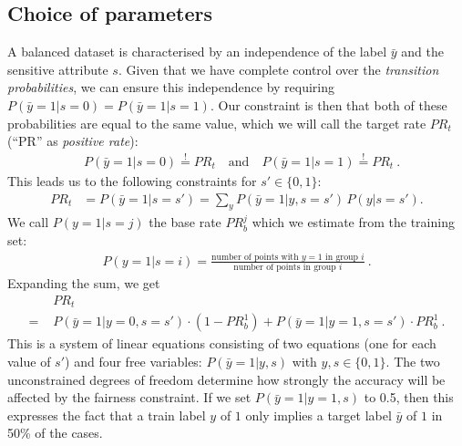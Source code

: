 \subsection{Choice of parameters}\label{sec:dp}
A balanced dataset is characterised by an independence of the label $\bar{y}$ and the sensitive attribute $s$.
Given that we have complete control over the \emph{transition probabilities},
we can ensure this independence by requiring $P(\bar{y}=1|s=0)=P(\bar{y}=1|s=1)$.
Our constraint is then that both of these probabilities are equal to the same value,
which we will call the target rate $\mathit{PR}_t$ (``PR'' as \emph{positive rate}):
\begin{align}
  &P(\bar{y}=1|s=0) \overset{!}{=} \mathit{PR}_t\quad\text{and}%
  \quad P(\bar{y}=1|s=1) \overset{!}{=} \mathit{PR}_t~.
\end{align}
This leads us to the following constraints for $s\prime\in\{0, 1\}$:
\begin{align}
  \mathit{PR}_t &= P(\bar{y}=1|s=s\prime) %
  =\sum\limits_y P(\bar{y}=1|y,s=s\prime)\, P(y|s=s\prime).\label{eq:dpconstraint}
\end{align}
We call $P(y=1|s=j)$ the base rate $\mathit{PR}_b^j$ which we estimate from the training set:
\begin{align*}
  P(y=1|s=i) = \frac{\text{number of points with } y=1 \text{ in group }i}
  {\text{number of points in group }i}~.
\end{align*}
Expanding the sum, we get
\begin{align}
  &\mathit{PR}_t \nonumber\\
  =\,\, &P(\bar{y}=1|y=0,s=s\prime) \cdot (1-\mathit{PR}_b^1) 
  +P(\bar{y}=1|y=1,s=s\prime) \cdot \mathit{PR}_b^1~.\label{eq:dpconstexpanded}
\end{align}
This is a system of linear equations consisting of two equations (one for each value of $s\prime$)
and four free variables: $P(\bar{y}=1|y,s)$ with $y,s\in\{0, 1\}$.
The two unconstrained degrees of freedom determine how strongly the accuracy will be affected by the fairness constraint.
If we set $P(\bar{y}=1|y=1,s)$ to 0.5,
then this expresses the fact that a train label $y$ of $1$ only implies a target label $\bar{y}$ of $1$ in 50\% of the cases.
